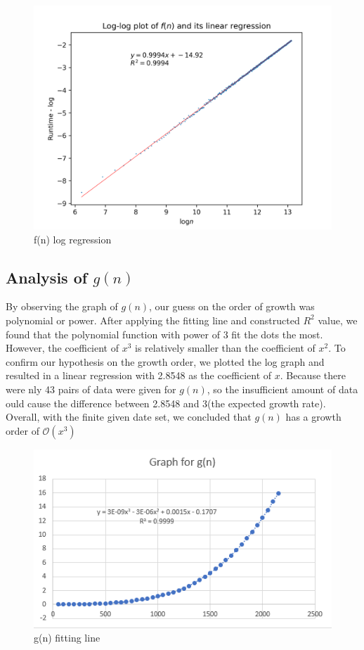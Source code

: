\documentclass[titlepage, 12pt]{article}
\begin{document}
\begin{figure}[h]
    \includegraphics[width=\linewidth]{fn-log-linreg.png}
    \caption{f(n) log regression}
\end{figure}

\subsection{Analysis of $g(n)$}
By observing the graph of $g(n)$, our guess on the order of growth was polynomial 
or power. After applying the fitting line and constructed $R^{2}$ value, we found 
that the polynomial function with power of 3 fit the dots the most. However, 
the coefficient of $x^{3}$ is relatively smaller than the coefficient of $x^{2}$. To 
confirm our hypothesis on the growth order, we plotted the log graph and resulted 
in a linear regression with 2.8548 as the coefficient of $x$. Because there were 
nly 43 pairs of data were given for $g(n)$, so the insufficient amount of data 
ould cause the difference between 2.8548 and 3(the expected growth rate). 
Overall, with the finite given date set, we concluded that $g(n)$ has a growth 
order of $\mathcal{O}(x^{3})$
\begin{figure}[h]
    \includegraphics[width=\linewidth]{gn-1.png}
    \caption{g(n) fitting line}
\end{figure}
\end{document}
